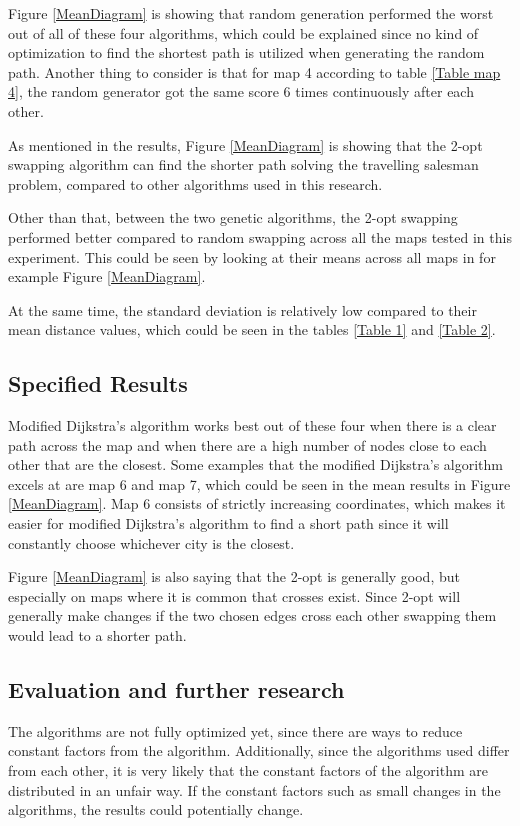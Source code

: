 \documentclass{article}
\begin{document}
\noindent
Figure \ref{MeanDiagram} is showing that random generation performed the worst out of all of these four algorithms, which could be explained since no kind of optimization to find the shortest path is utilized when generating the random path. Another thing to consider is that for map 4 according to table \ref{Table map 4}, the random generator got the same score 6 times continuously after each other.

\noindent
As mentioned in the results, Figure \ref{MeanDiagram} is showing that the 2-opt swapping algorithm can find the shorter path solving the travelling salesman problem, compared to other algorithms used in this research.

\noindent
Other than that, between the two genetic algorithms, the 2-opt swapping performed better compared to random swapping across all the maps tested in this experiment. This could be seen by looking at their means across all maps in for example Figure \ref{MeanDiagram}. 

\noindent
At the same time, the standard deviation is relatively low compared to their mean distance values, which could be seen in the tables \ref{Table 1} and \ref{Table 2}. 

\subsection{Specified Results}\label{subsec2}
Modified Dijkstra's algorithm works best out of these four when there is a clear path across the map and when there are a high number of nodes close to each other that are the closest. Some examples that the modified Dijkstra's algorithm excels at are map 6 and map 7, which could be seen in the mean results in Figure \ref{MeanDiagram}. Map 6 consists of strictly increasing coordinates, which makes it easier for modified Dijkstra's algorithm to find a short path since it will constantly choose whichever city is the closest. 

\noindent
Figure \ref{MeanDiagram} is also saying that the 2-opt is generally good, but especially on maps where it is common that crosses exist. Since 2-opt will generally make changes if the two chosen edges cross each other swapping them would lead to a shorter path.


\subsection{Evaluation and further research}\label{subsec3}
The algorithms are not fully optimized yet, since there are ways to reduce constant factors from the algorithm. Additionally, since the algorithms used differ from each other, it is very likely that the constant factors of the algorithm are distributed in an unfair way. If the constant factors such as small changes in the algorithms, the results could potentially change. 
\end{document}

